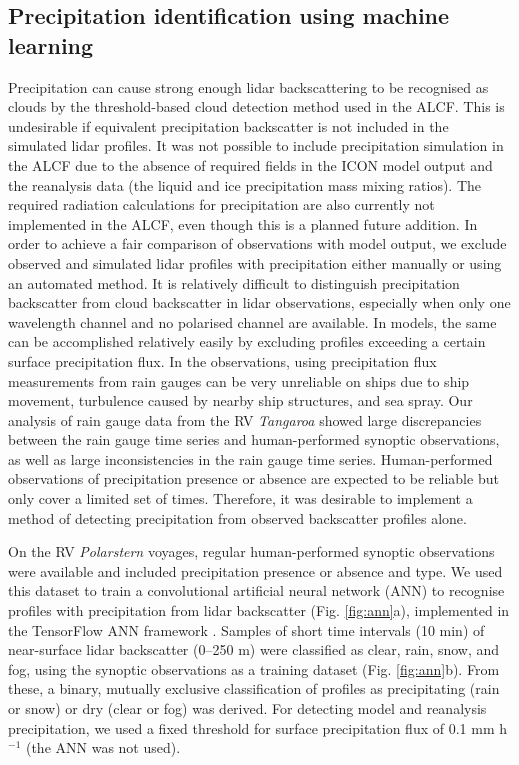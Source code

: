 \documentclass[12pt,a4paper]{article}
\begin{document}
\subsection{Precipitation identification using machine learning}
\label{sec:ann}

Precipitation can cause strong enough lidar backscattering to be recognised as
clouds by the threshold-based cloud detection method used in the ALCF. This is
undesirable if equivalent precipitation backscatter is not included in the
simulated lidar profiles. It was not possible to include precipitation
simulation in the ALCF due to the absence of required fields in the ICON model
output and the reanalysis data (the liquid and ice precipitation mass mixing
ratios). The required radiation calculations for precipitation are also
currently not implemented in the ALCF, even though this is a planned future addition.
In order to achieve a fair comparison of observations with model output, we
exclude observed and simulated lidar profiles with precipitation either
manually or using an automated method. It is relatively difficult to
distinguish precipitation backscatter from cloud backscatter in lidar
observations, especially when only one wavelength channel and no polarised
channel are available. In models, the same can be accomplished relatively
easily by excluding profiles exceeding a certain surface
precipitation flux. In the observations, using precipitation flux measurements
from rain gauges can be very unreliable on ships due to ship movement,
turbulence caused by nearby ship structures, and sea spray. Our analysis of
rain gauge data from the RV \emph{Tangaroa} showed large discrepancies between
the rain gauge time series and human-performed synoptic observations, as well
as large inconsistencies in the rain gauge time series. Human-performed
observations of precipitation presence or absence are expected to be reliable
but only cover a limited set of times. Therefore, it was desirable to
implement a method of detecting precipitation from observed backscatter
profiles alone.

On the RV \emph{Polarstern} voyages, regular human-performed synoptic
observations were available and included precipitation presence or absence and
type. We used this dataset to train a convolutional artificial neural network
(ANN) to recognise profiles with precipitation from lidar backscatter (Fig.
\ref{fig:ann}a), implemented in the TensorFlow ANN framework
\citep{tensorflow}. Samples of short time intervals (10 min) of near-surface
lidar backscatter (0–250 m) were classified as clear, rain, snow, and fog,
using the synoptic observations as a training dataset (Fig.  \ref{fig:ann}b).
From these, a binary, mutually exclusive classification of profiles as
precipitating (rain or snow) or dry (clear or fog) was derived.  For detecting
model and reanalysis precipitation, we used a fixed threshold for surface
precipitation flux of 0.1 mm h$^{-1}$ (the ANN was not used).
\end{document}
